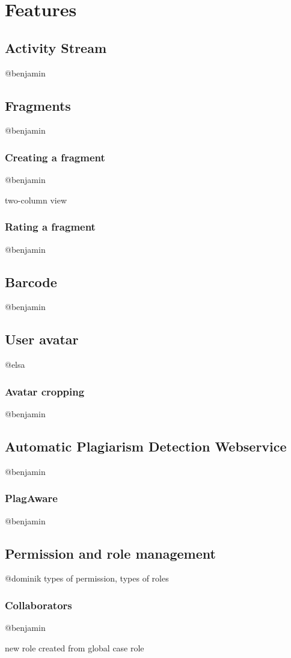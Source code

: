 \chapter{Features}\label{chap:features}

\section{Activity Stream}
@benjamin

\section{Fragments}
@benjamin

\subsection{Creating a fragment}
@benjamin

two-column view


\subsection{Rating a fragment}
@benjamin

\section{Barcode}
@benjamin

\section{User avatar}
@elsa

\subsection{Avatar cropping}
@benjamin

\section{Automatic Plagiarism Detection Webservice}
@benjamin
\subsection{PlagAware}
@benjamin

\section{Permission and role management}
@dominik
types of permission, types of roles

\subsection{Collaborators}
@benjamin

new role created from global case role